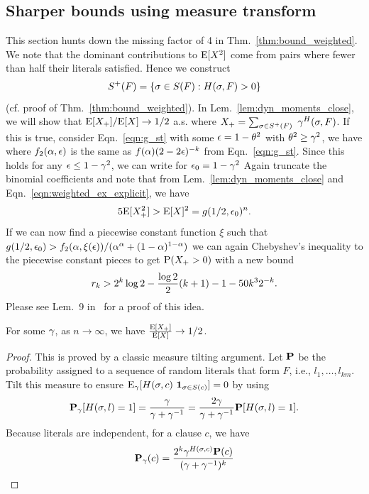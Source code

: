 \documentclass[letterpaper, 10pt, twocolumn, reqno]{amsart}
\begin{document}
\subsection{Sharper bounds using measure transform}
\label{ssec:sharper_bounds}

This section hunts down the missing factor of 4 in Thm.~\ref{thm:bound_weighted}. We note that the dominant contributions to $\E[X^2]$ come from pairs where fewer than half their literals satisfied. Hence we construct
$$\spf = \cbrac{\s \in \sf: \hsf > 0}$$
(cf. proof of Thm.~\ref{thm:bound_weighted}). In Lem.~\ref{lem:dyn_moments_close}, we will show that $\E[X_+]/\E[X] \to 1/2$ a.s. where $X_+ = \sum_{\s \in \spf}\ \g^\hsf$. If this is true, consider Eqn.~\ref{eqn:g_st} with some $\e = 1 -\th^2$ with $\th^2 \geq \g^2$, we have
where $f_2(\a,\e)$ is the same as $f(\a) (2-2\e)^{-k}$ from Eqn.~\eqref{eqn:g_st}. Since this holds for any $\e \leq 1 -\g^2$, we can write for $\e_0 = 1 - \g^2$
Again truncate the binomial coefficients and note that from Lem.~\ref{lem:dyn_moments_close} and Eqn.~\eqref{eqn:weighted_ex_explicit}, we have
$$
5 \E[X_+^2] > \E[X]^2 = g(1/2, \e_0)^n.
$$
If we can now find a piecewise constant function $\xi$ such that $g(1/2,\e_0) > f_2(\a,\xi(\e))/(\a^\a + (1-\a)^{1-\a})$ we can again Chebyshev's inequality to the piecewise constant pieces to get $\P(X_+ > 0)$ with a new bound
$$r_k > 2^k \log 2 -\f{\log 2}{2} (k+1) -1 -50k^3 2^{-k}.$$
Please see Lem.~9 in~\cite{achlioptas2004threshold} for a proof of this idea.

\begin{lemma}
For some $\g$, as $n\to \infty$, we have $\f{\E[X_+]}{\E[X]} \to 1/2$.
\label{lem:dyn_moments_close}
\end{lemma}
\begin{proof}
This is proved by a classic measure tilting argument. Let $\bP$ be the probability assigned to a sequence of random literals that form $F$, i.e., $l_1, \ldots, l_{km}$. Tilt this measure to ensure $\E_\g[\hsc\ \ind_{\s \in \sc}] = 0$ by using
$$
\bPg[\hsl = 1] = \f{\g}{\g + \g^{-1}} = \f{2 \g}{\g + \g^{-1}} \bP[\hsl = 1].
$$
Because literals are independent, for a clause $c$, we have
$$
\bPg(c) = \f{2^k \g^{\hsc} \bP(c)}{(\g +\g^{-1})^k}
$$
\end{proof}
\end{document}
